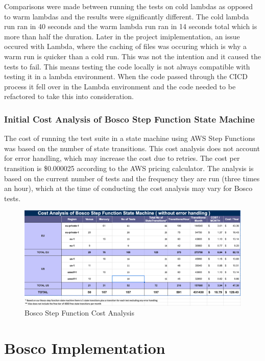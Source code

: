 \documentclass[12pt,a4paper,titlepage]{report}
\begin{document}
Comparisons were made between running the tests on cold lambdas as opposed to warm lambdas and the results were significantly different. The cold lambda run ran in 40 seconds and the warm lambda run ran in 14 seconds total which is more than half the duration. 
Later in the project imiplementation, an issue occured with Lambda, where the caching of files was occuring which is why a warm run is quicker than a cold run. This was not the intention and it caused the tests to fail. 
This means testing the code locally is not always compatible with testing it in a lambda environment. When the code passed through the CICD process it fell over in the Lambda environment and the code needed to be refactored to take this into consideration.

\subsection{Initial Cost Analysis of Bosco Step Function State Machine}

The cost of running the test suite in a state machine using AWS Step Functions was based on the number of state transitions.\autocite{Amazon} 
This cost analysis does not account for error handling, which may increase the cost due to retries. The cost per transition is \$0.000025 according to the AWS pricing calculator. 
The analysis is based on the current number of tests and the frequency they are run (three times an hour), which at the time of conducting the cost analysis may vary for Bosco tests.

\begin{figure}[H]
 \centering
 \includegraphics[width=15cm]{./diagrams/sfcost}
 \caption{Bosco Step Function Cost Analysis}
\end{figure}

\chapter{Bosco Implementation}
\end{document}
